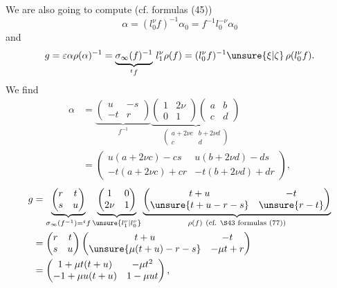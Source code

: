 We are also going to compute  (cf. formulas (45))
\[
\alpha=(l_0^\nu f)^{-1}\alpha_0=f^{-1}l_0^{-\nu}\alpha_0
\]
and
\[
g=\varepsilon\alpha\rho(\alpha)^{-1}
=\underbrace{\sigma_\infty(f)^{-1}}_{{}^t f}\,l_1^\nu\rho(f)
=(l_0^\nu f)^{-1}\unsure{\xi|\zeta}\,\rho(l_0^\nu f).
\]
We find
\[
\tag{64}
\begin{aligned}
\alpha&=\underbrace{\begin{pmatrix}u&-s\\-t&r\end{pmatrix}}_{f^{-1}}
\underbrace{\begin{pmatrix}1&2\nu\\0&1\end{pmatrix}
\begin{pmatrix}a&b\\c&d\end{pmatrix}}_{\begin{pmatrix}a+2\nu c&b+2\nu d\\c&d\end{pmatrix}}\\
&=\begin{pmatrix}u(a+2\nu c)-cs&u(b+2\nu d)-ds\\-t(a+2\nu c)+cr&-t(b+2\nu d)+dr\end{pmatrix},
\end{aligned}
\]
\[
\begin{aligned}
g&=\underbrace{\begin{pmatrix}r&t\\s&u\end{pmatrix}}_{\sigma_\infty(f^{-1})={}^t f}
\underbrace{\begin{pmatrix}1&0\\2\nu&1\end{pmatrix}}_{\unsure{l_1^\nu|l_0^\nu}}
\underbrace{\begin{pmatrix}t+u&-t\\\unsure{t+u-r-s}&\unsure{r-t}\end{pmatrix}}_{\rho(f)\ (\text{cf. \S43 formulas }(77))}\\
&=\begin{pmatrix}r&t\\s&u\end{pmatrix}
\begin{pmatrix}t+u&-t\\\unsure{\mu(t+u)-r-s}&-\mu t+r\end{pmatrix}\\
&=\begin{pmatrix}1+\mu t(t+u)&-\mu t^2\\-1+\mu u(t+u)&1-\mu ut\end{pmatrix},
\end{aligned}
\]
